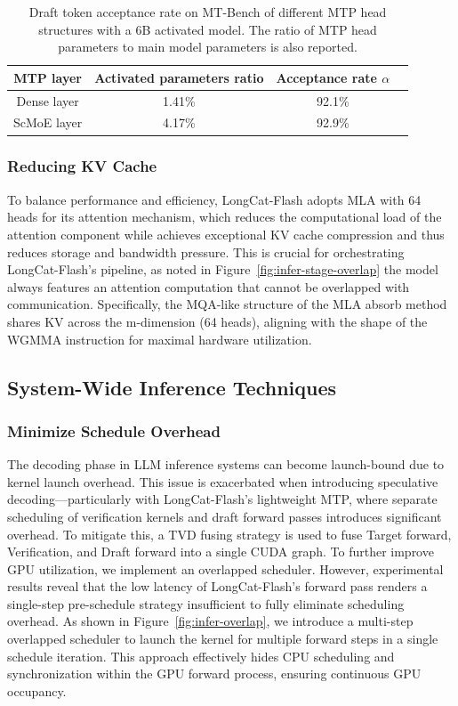 \documentclass{article}
\newcommand{\longcat}{LongCat-Flash\xspace}
\begin{document}
\begin{table}[ht]
\caption{Draft token acceptance rate on MT-Bench of different MTP head structures with a 6B activated model. The ratio of MTP head parameters to main model parameters is also reported.}
\centering
\begin{tabular}{cccc}
\toprule
MTP layer & Activated parameters ratio &  Acceptance rate $\alpha$ \\ 
\midrule
Dense layer  & 1.41\%  & 92.1\%   \\ 
ScMoE layer  &  4.17\%  &  92.9\%  \\ 
\bottomrule
\end{tabular}
\label{table:mtp_speedup}
\end{table}

\subsubsection{Reducing KV Cache}

To balance performance and efficiency, \longcat adopts MLA with 64 heads for its attention mechanism, which reduces the computational load of the attention component while achieves exceptional KV cache compression and thus reduces storage and bandwidth pressure. This is crucial for orchestrating \longcat's pipeline, as noted in Figure~\ref{fig:infer-stage-overlap} the model always features an attention computation that cannot be overlapped with communication. Specifically, the MQA-like structure of the MLA absorb method shares KV across the m-dimension (64 heads), aligning with the shape of the WGMMA instruction for maximal hardware utilization. %

\subsection{System-Wide Inference Techniques}

\subsubsection{Minimize Schedule Overhead}

The decoding phase in LLM inference systems can become launch-bound due to kernel launch overhead. This issue is exacerbated when introducing speculative decoding---particularly with \longcat's lightweight MTP, where separate scheduling of verification kernels and draft forward passes introduces significant overhead. To mitigate this, a TVD fusing strategy is used to fuse Target forward, Verification, and Draft forward into a single CUDA graph.
To further improve GPU utilization, we implement an overlapped scheduler. However, experimental results reveal that the low latency of \longcat's forward pass renders a single-step pre-schedule strategy insufficient to fully eliminate scheduling overhead. As shown in Figure~\ref{fig:infer-overlap}, we introduce a multi-step overlapped scheduler to launch the kernel for multiple forward steps in a single schedule iteration. This approach effectively hides CPU scheduling and synchronization within the GPU forward process, ensuring continuous GPU occupancy. 
\end{document}
